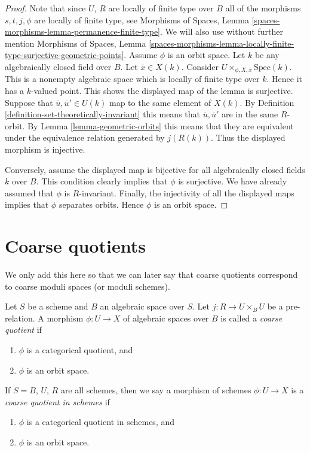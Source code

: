 \begin{proof}
Note that since $U$, $R$ are locally of finite type over $B$ all of the
morphisms $s, t, j, \phi$ are locally of finite type, see
Morphisms of Spaces, Lemma \ref{spaces-morphisms-lemma-permanence-finite-type}.
We will also use without further mention
Morphisms of Spaces, Lemma
\ref{spaces-morphisms-lemma-locally-finite-type-surjective-geometric-points}.
Assume $\phi$ is an orbit space. Let $k$ be any algebraically closed
field over $B$. Let $\overline{x} \in X(k)$. Consider
$U \times_{\phi, X, \overline{x}} \text{Spec}(k)$.
This is a nonempty algebraic space
which is locally of finite type over $k$. Hence it has a $k$-valued point.
This shows the displayed map of the lemma is surjective.
Suppose that $\overline{u}, \overline{u}' \in U(k)$ map to the same
element of $X(k)$. By
Definition \ref{definition-set-theoretically-invariant}
this means that $\overline{u}, \overline{u}'$ are in the same
$R$-orbit. By Lemma \ref{lemma-geometric-orbits} this means that
they are equivalent under the equivalence relation generated by
$j(R(k))$. Thus the displayed morphism is injective.

\medskip\noindent
Conversely, assume the displayed map is bijective for all algebraically
closed fields $k$ over $B$. This condition clearly implies that $\phi$
is surjective. We have already assumed that $\phi$ is $R$-invariant.
Finally, the injectivity of all the displayed maps implies that
$\phi$ separates orbits. Hence $\phi$ is an orbit space.
\end{proof}










\section{Coarse quotients}
\label{section-coarse}

\noindent
We only add this here so that we can later say that coarse quotients
correspond to coarse moduli spaces (or moduli schemes).

\begin{definition}
\label{definition-coarse}
Let $S$ be a scheme and $B$ an algebraic space over $S$.
Let $j : R \to U \times_B U$ be a pre-relation.
A morphism $\phi : U \to X$ of algebraic spaces over $B$
is called a {\it coarse quotient} if
\begin{enumerate}
\item $\phi$ is a categorical quotient, and
\item $\phi$ is an orbit space.
\end{enumerate}
If $S = B$, $U$, $R$ are all schemes, then we say a morphism of schemes
$\phi : U \to X$ is a {\it coarse quotient in schemes} if
\begin{enumerate}
\item $\phi$ is a categorical quotient in schemes, and
\item $\phi$ is an orbit space.
\end{enumerate}
\end{definition}

